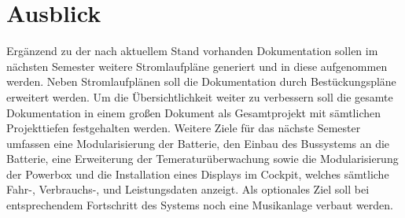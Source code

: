 \section{Ausblick}
Ergänzend zu der nach aktuellem Stand vorhanden Dokumentation sollen im nächsten Semester weitere Stromlaufpläne generiert und in diese aufgenommen werden. Neben Stromlaufplänen soll die Dokumentation durch Bestückungspläne erweitert werden. Um die Übersichtlichkeit weiter zu verbessern soll die gesamte Dokumentation in einem großen Dokument als Gesamtprojekt mit sämtlichen Projekttiefen festgehalten werden. Weitere Ziele für das nächste Semester umfassen eine Modularisierung der Batterie, den Einbau des Bussystems an die Batterie, eine Erweiterung der Temeraturüberwachung sowie die Modularisierung der Powerbox und die Installation eines Displays im Cockpit, welches sämtliche Fahr-, Verbrauchs-, und Leistungsdaten anzeigt. Als optionales Ziel soll bei entsprechendem Fortschritt des Systems noch eine Musikanlage verbaut werden.
